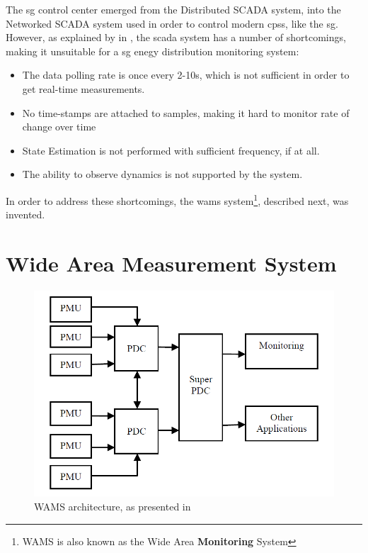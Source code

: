   
 The \acrshort{sg} control center emerged from the Distributed SCADA system, into the Networked SCADA system used in order to control modern \acrlong{cps}s, like the \acrshort{sg}.\\ 
 


 




 




However, as explained by  in \Cite{zamani2020introduction}, the \acrshort{scada} system has a number of shortcomings, making it unsuitable for a \acrshort{sg} enegy distribution monitoring system:

\begin{itemize}
    \item The data polling rate is once every 2-10s, which is not sufficient in order to get real-time measurements.
    \item No time-stamps are attached to samples, making it hard to monitor rate of change over time
    \item State Estimation is not performed with sufficient frequency, if at all.
    \item The ability to observe dynamics is not supported by the system.
\end{itemize}





In order to address these shortcomings, the \acrfull{wams} system\footnote{WAMS is also known as the Wide Area \textbf{Monitoring} System}, described next, was invented.




\section{Wide Area Measurement System}
\begin{figure}[ht]
\includegraphics[width=\linewidth]{figures/Kumar-WAMS-architecture.png}
\caption[WAMS architecture]{WAMS architecture, as presented in \cite{kumar2015monitoring}}
\label{fig:Kumar-WAMS-architecture}
\end{figure}


